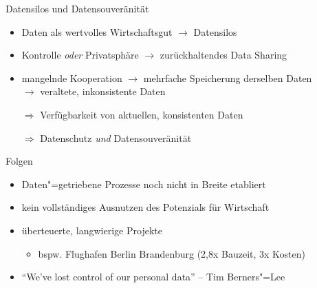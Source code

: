 \begin{frame}{Datensilos und Datensouveränität}
    \begin{itemize}
        \item Daten als wertvolles Wirtschaftsgut $\to$ Datensilos
        \item Kontrolle \emph{oder} Privatsphäre $\to$ zurückhaltendes Data Sharing
        \item mangelnde Kooperation $\to$ mehrfache Speicherung derselben Daten\\
              $\to$ veraltete, inkonsistente Daten
        
        \item[$\Rightarrow$] Verfügbarkeit von aktuellen, konsistenten Daten
        \item[$\Rightarrow$] Datenschutz \emph{und} Datensouveränität
    \end{itemize}
\end{frame}


\begin{frame}{Folgen}
    \begin{itemize}
        \item Daten"=getriebene Prozesse noch nicht in Breite etabliert
        \item kein vollständiges Ausnutzen des Potenzials für Wirtschaft

        \item überteuerte, langwierige Projekte
        \begin{itemize}
            \item bspw. Flughafen Berlin Brandenburg (2,8x Bauzeit, 3x Kosten)~\cite{stalinskiBestBERZahlen2020}
        \end{itemize}

        \item \enquote{We've lost control of our personal data} -- Tim Berners"=Lee~\cite{berners-leeThreeChallengesWeb2017}
    \end{itemize}
\end{frame}
